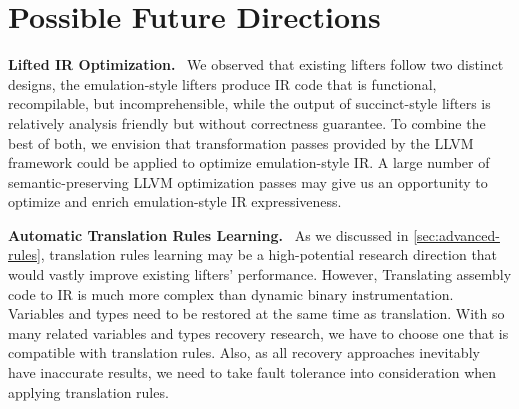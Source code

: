 \section{Possible Future Directions}\label{sec:future-directions}
\noindent\textbf{Lifted IR Optimization.}~
We observed that existing lifters follow two distinct designs, the 
emulation-style lifters produce IR code that is functional, recompilable, but 
incomprehensible, while the output of succinct-style lifters is relatively 
analysis friendly but without correctness guarantee. To combine the best of 
both, we envision that transformation passes provided by the LLVM framework 
could be applied to optimize emulation-style IR. A large number of 
semantic-preserving LLVM optimization passes may give us an opportunity to 
optimize and enrich emulation-style IR expressiveness.

\noindent\textbf{Automatic Translation Rules Learning.}~
As we discussed in \autoref{sec:advanced-rules}, translation rules learning may 
be a high-potential research direction that would vastly improve existing 
lifters' performance. However, Translating assembly code to IR is much more 
complex than dynamic binary instrumentation. Variables and types need to be 
restored at the same time as translation. With so many related variables and 
types recovery research, we have to choose one that is compatible with 
translation rules. Also, as all recovery approaches inevitably have inaccurate 
results, we need to take fault tolerance into consideration when applying 
translation rules.


\newpage
